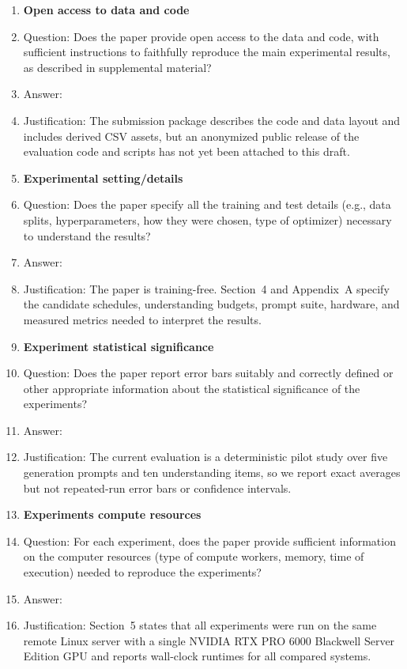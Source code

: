 \begin{enumerate}[leftmargin=*]
\item \textbf{Open access to data and code}
\item[] Question: Does the paper provide open access to the data and code, with sufficient instructions to faithfully reproduce the main experimental results, as described in supplemental material?
\item[] Answer: \answerNo{}
\item[] Justification: The submission package describes the code and data layout and includes derived CSV assets, but an anonymized public release of the evaluation code and scripts has not yet been attached to this draft.

\item \textbf{Experimental setting/details}
\item[] Question: Does the paper specify all the training and test details (e.g., data splits, hyperparameters, how they were chosen, type of optimizer) necessary to understand the results?
\item[] Answer: \answerYes{}
\item[] Justification: The paper is training-free. Section~4 and Appendix~A specify the candidate schedules, understanding budgets, prompt suite, hardware, and measured metrics needed to interpret the results.

\item \textbf{Experiment statistical significance}
\item[] Question: Does the paper report error bars suitably and correctly defined or other appropriate information about the statistical significance of the experiments?
\item[] Answer: \answerNo{}
\item[] Justification: The current evaluation is a deterministic pilot study over five generation prompts and ten understanding items, so we report exact averages but not repeated-run error bars or confidence intervals.

\item \textbf{Experiments compute resources}
\item[] Question: For each experiment, does the paper provide sufficient information on the computer resources (type of compute workers, memory, time of execution) needed to reproduce the experiments?
\item[] Answer: \answerYes{}
\item[] Justification: Section~5 states that all experiments were run on the same remote Linux server with a single NVIDIA RTX PRO 6000 Blackwell Server Edition GPU and reports wall-clock runtimes for all compared systems.


\end{enumerate}
